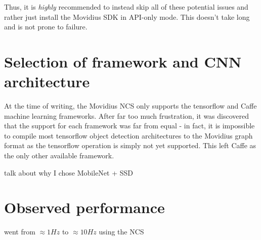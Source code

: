 Thus, it is \emph{highly} recommended to instead skip all of these potential issues and rather just install the Movidius SDK in API-only mode. This doesn't take long and is not prone to failure.


\section{Selection of framework and CNN architecture}
At the time of writing, the Movidius NCS only supports the tensorflow and Caffe machine learning frameworks. After far too much frustration, it was discovered that the support for each framework was far from equal - in fact, it is impossible to compile most tensorflow object detection architectures to the Movidius graph format as the tensorflow  operation is simply not yet supported. This left Caffe as the only other available framework.

{\Large \color{red} talk about why I chose MobileNet + SSD}


\section{Observed performance}
{\Large \color{red} went from $\approx 1 Hz$ to $\approx 10 Hz$ using the NCS}
